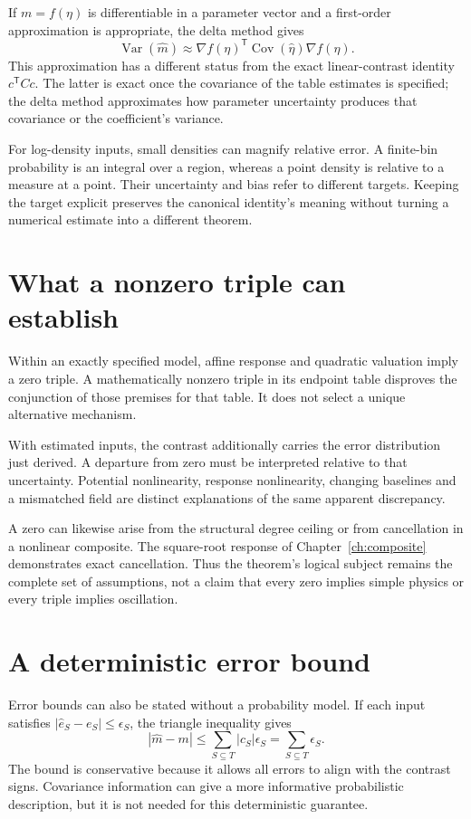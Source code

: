 If $m=f(\eta)$ is differentiable in a parameter vector and a first-order approximation is appropriate, the delta method gives
\begin{equation}
 \operatorname{Var}(\widehat m)\approx
 \nabla f(\eta)^{\mathsf T}\operatorname{Cov}(\widehat\eta)\nabla f(\eta).
\end{equation}
This approximation has a different status from the exact linear-contrast identity $c^{\mathsf T}Cc$. The latter is exact once the covariance of the table estimates is specified; the delta method approximates how parameter uncertainty produces that covariance or the coefficient's variance.

For log-density inputs, small densities can magnify relative error. A finite-bin probability is an integral over a region, whereas a point density is relative to a measure at a point. Their uncertainty and bias refer to different targets. Keeping the target explicit preserves the canonical identity's meaning without turning a numerical estimate into a different theorem.

\section{What a nonzero triple can establish}
Within an exactly specified model, affine response and quadratic valuation imply a zero triple. A mathematically nonzero triple in its endpoint table disproves the conjunction of those premises for that table. It does not select a unique alternative mechanism.

With estimated inputs, the contrast additionally carries the error distribution just derived. A departure from zero must be interpreted relative to that uncertainty. Potential nonlinearity, response nonlinearity, changing baselines and a mismatched field are distinct explanations of the same apparent discrepancy.

A zero can likewise arise from the structural degree ceiling or from cancellation in a nonlinear composite. The square-root response of Chapter~\ref{ch:composite} demonstrates exact cancellation. Thus the theorem's logical subject remains the complete set of assumptions, not a claim that every zero implies simple physics or every triple implies oscillation.

\section{A deterministic error bound}
Error bounds can also be stated without a probability model. If each input satisfies $|\widehat e_S-e_S|\leq\epsilon_S$, the triangle inequality gives
\begin{equation}\label{eq:deterministic-contrast-error}
 |\widehat m-m|\leq\sum_{S\subseteq T}|c_S|\epsilon_S
 =\sum_{S\subseteq T}\epsilon_S.
\end{equation}
The bound is conservative because it allows all errors to align with the contrast signs. Covariance information can give a more informative probabilistic description, but it is not needed for this deterministic guarantee.

